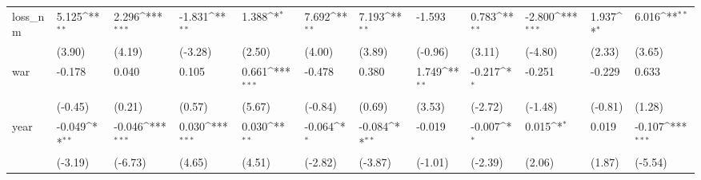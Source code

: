 \def\sym#1{\ifmmode^{#1}\else\(^{#1}\)\fi}
\begin{tabular}{p{1.5cm} p{2cm} p{1.7cm} p{1.7cm} p{1.7cm} p{1.7cm} p{1.7cm} p{1.7cm} p{1.7cm} p{1.7cm} p{1.7cm} p{1.7cm}}
\hline
loss\_nm         &    5.125\sym{**} &    2.296\sym{***}&   -1.831\sym{**} &    1.388\sym{*}  &    7.692\sym{**} &    7.193\sym{**} &   -1.593         &    0.783\sym{**} &   -2.800\sym{***}&    1.937\sym{*}  &    6.016\sym{**} \\
                &   (3.90)         &   (4.19)         &  (-3.28)         &   (2.50)         &   (4.00)         &   (3.89)         &  (-0.96)         &   (3.11)         &  (-4.80)         &   (2.33)         &   (3.65)         \\
war             &   -0.178         &    0.040         &    0.105         &    0.661\sym{***}&   -0.478         &    0.380         &    1.749\sym{**} &   -0.217\sym{*}  &   -0.251         &   -0.229         &    0.633         \\
                &  (-0.45)         &   (0.21)         &   (0.57)         &   (5.67)         &  (-0.84)         &   (0.69)         &   (3.53)         &  (-2.72)         &  (-1.48)         &  (-0.81)         &   (1.28)         \\
year            &   -0.049\sym{**} &   -0.046\sym{***}&    0.030\sym{***}&    0.030\sym{**} &   -0.064\sym{*}  &   -0.084\sym{**} &   -0.019         &   -0.007\sym{*}  &    0.015\sym{*}  &    0.019         &   -0.107\sym{***}\\
                &  (-3.19)         &  (-6.73)         &   (4.65)         &   (4.51)         &  (-2.82)         &  (-3.87)         &  (-1.01)         &  (-2.39)         &   (2.06)         &   (1.87)         &  (-5.54)         \\
\end{tabular}
\def\sym#1{\ifmmode^{#1}\else\(^{#1}\)\fi}
